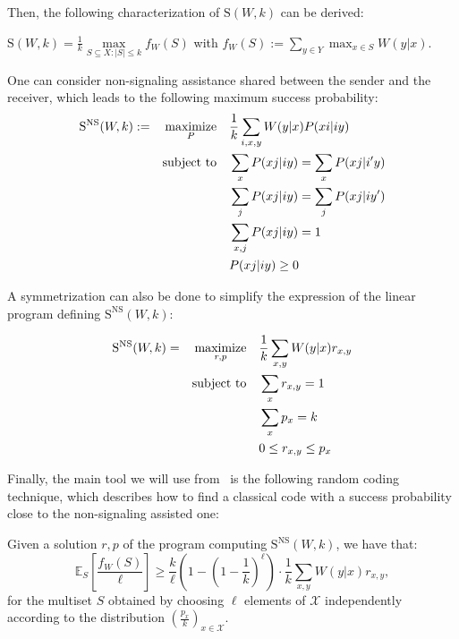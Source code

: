Then, the following characterization of $\mathrm{S}(W,k)$ can be derived:

\begin{proposition}
  $\mathrm{S}(W,k) = \frac{1}{k} \underset{S \subseteq X: |S| \leq k}{\max} f_W(S)$ with $f_W(S) := \sum_{y \in Y} \max_{x \in S} W(y|x)$.
\end{proposition}

One can consider non-signaling assistance shared between the sender and the receiver, which leads to the following maximum success probability:
\begin{equation}
  \begin{aligned}
    \mathrm{S}^{\mathrm{NS}}(W,k) := &&\underset{P}{\operatorname{\text{maximize}}} &&& \frac{1}{k} \sum_{i,x,y} W(y|x)P(xi|iy)\\
    &&\operatorname{\text{subject to}} &&& \sum_{x} P(xj|iy) = \sum_{x} P(xj|i'y)\\
    &&&&& \sum_{j} P(xj|iy) = \sum_{j} P(xj|iy')\\
    &&&&& \sum_{x,j} P(xj|iy) = 1\\
    &&&&& P(xj|iy) \geq 0
  \end{aligned}
\end{equation}

A symmetrization can also be done to simplify the expression of the linear program defining $\mathrm{S}^{\mathrm{NS}}(W,k)$:
\begin{proposition}
  \label{prop:NSonewayLP}
  \begin{equation}
    \begin{aligned}
      \mathrm{S}^{\mathrm{NS}}(W,k) = &&\underset{r,p}{\operatorname{\text{maximize}}} &&& \frac{1}{k} \sum_{x,y} W(y|x)r_{x,y}\\
      &&\operatorname{\text{subject to}} &&& \sum_{x} r_{x,y} = 1\\
      &&&&& \sum_{x} p_{x} = k\\
      &&&&& 0 \leq r_{x,y} \leq p_{x}
    \end{aligned}
  \end{equation}
\end{proposition}

Finally, the main tool we will use from~\cite{BF18} is the following random coding technique, which describes how to find a classical code with a success probability close to the non-signaling assisted one:
\begin{theorem}
  \label{theo:RandomCoding}
  Given a solution $r,p$ of the program computing $\mathrm{S}^{\mathrm{NS}}(W,k)$, we have that:
  \[ \mathbb{E}_S\left[\frac{f_W(S)}{\ell}\right] \geq \frac{k}{\ell}\left(1-\left(1-\frac{1}{k}\right)^{\ell}\right) \cdot \frac{1}{k} \sum_{x,y} W(y|x)r_{x,y} , \]
  for the multiset $S$ obtained by choosing $\ell$ elements of $\mathcal{X}$ independently according to the distribution $\left(\frac{p_{x}}{k}\right)_{x \in \mathcal{X}}$.
\end{theorem}
